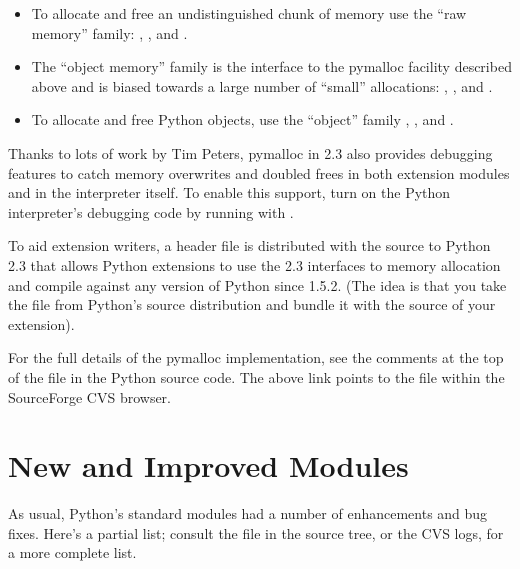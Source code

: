\documentclass{howto}
\begin{document}
\begin{itemize}
  \item To allocate and free an undistinguished chunk of memory use
  the ``raw memory'' family: ,
  , and .

  \item The ``object memory'' family is the interface to the pymalloc
  facility described above and is biased towards a large number of
  ``small'' allocations: ,
  , and .

  \item To allocate and free Python objects, use the ``object'' family
  , , and
  .
\end{itemize}

Thanks to lots of work by Tim Peters, pymalloc in 2.3 also provides
debugging features to catch memory overwrites and doubled frees in
both extension modules and in the interpreter itself.  To enable this
support, turn on the Python interpreter's debugging code by running
 with .  

To aid extension writers, a header file  is
distributed with the source to Python 2.3 that allows Python
extensions to use the 2.3 interfaces to memory allocation and compile
against any version of Python since 1.5.2.  (The idea is that you take
the file from Python's source distribution and bundle it with the
source of your extension).

\begin{seealso}

{For the full details of the pymalloc implementation, see
the comments at the top of the file  in the
Python source code.  The above link points to the file within the
SourceForge CVS browser.}

\end{seealso}

\section{New and Improved Modules}

As usual, Python's standard modules had a number of enhancements and
bug fixes.  Here's a partial list; consult the  file
in the source tree, or the CVS logs, for a more complete list.
\end{document}

